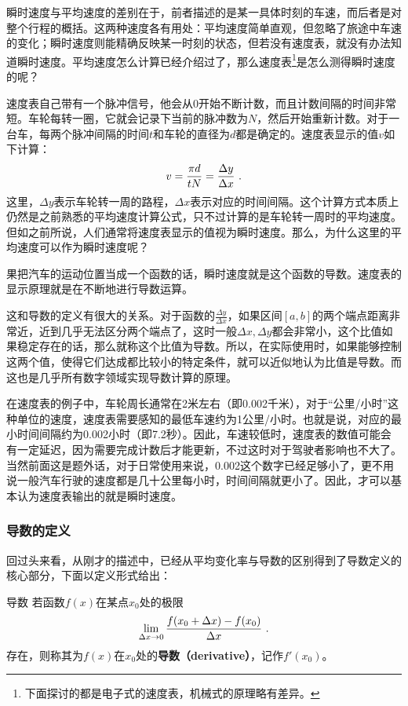 瞬时速度与平均速度的差别在于，前者描述的是某一具体时刻的车速，而后者是对整个行程的概括。这两种速度各有用处：平均速度简单直观，但忽略了旅途中车速的变化；瞬时速度则能精确反映某一时刻的状态，但若没有速度表，就没有办法知道瞬时速度。平均速度怎么计算已经介绍过了，那么速度表\footnote{下面探讨的都是电子式的速度表，机械式的原理略有差异。}是怎么测得瞬时速度的呢？

速度表自己带有一个脉冲信号，他会从0开始不断计数，而且计数间隔的时间非常短。车轮每转一圈，它就会记录下当前的脉冲数为$N$，然后开始重新计数。对于一台车，每两个脉冲间隔的时间$t$和车轮的直径为$d$都是确定的。速度表显示的值$v$如下计算：
\begin{equation}
v={\pi d\over tN}=\frac{\Delta y}{\Delta x}~.
\end{equation}
这里，$\Delta y$表示车轮转一周的路程，$\Delta x$表示对应的时间间隔。这个计算方式本质上仍然是之前熟悉的平均速度计算公式，只不过计算的是车轮转一周时的平均速度。但如之前所说，人们通常将速度表显示的值视为瞬时速度。那么，为什么这里的平均速度可以作为瞬时速度呢？

果把汽车的运动位置当成一个函数的话，瞬时速度就是这个函数的导数。速度表的显示原理就是在不断地进行导数运算。

这和导数的定义有很大的关系。对于函数的$\displaystyle\frac{\Delta y}{\Delta x}$，如果区间$[a, b]$的两个端点距离非常近，近到几乎无法区分两个端点了，这时一般$\Delta x,\Delta y$都会非常小，这个比值如果稳定存在的话，那么就称这个比值为导数。所以，在实际使用时，如果能够控制这两个值，使得它们达成都比较小的特定条件，就可以近似地认为比值是导数。而这也是几乎所有数字领域实现导数计算的原理。

在速度表的例子中，车轮周长通常在2米左右（即0.002千米），对于“公里/小时”这种单位的速度，速度表需要感知的最低车速约为1公里/小时。也就是说，对应的最小时间间隔约为0.002小时（即7.2秒）。因此，车速较低时，速度表的数值可能会有一定延迟，因为需要完成计数后才能更新，不过这时对于驾驶者影响也不大了。当然前面这是题外话，对于日常使用来说，0.002这个数字已经足够小了，更不用说一般汽车行驶的速度都是几十公里每小时，时间间隔就更小了。因此，才可以基本认为速度表输出的就是瞬时速度。

\subsubsection{导数的定义}

回过头来看，从刚才的描述中，已经从平均变化率与导数的区别得到了导数定义的核心部分，下面以定义形式给出：

\begin{definition}{导数}
若函数$f(x)$在某点$x_0$处的极限
\begin{equation}
\lim_{\Delta x\to 0}{f(x_0+\Delta x)-f(x_0)\over \Delta x}~.
\end{equation}
存在，则称其为$f(x)$在$x_0$处的\textbf{导数（derivative）}，记作$f'(x_0)$。
\end{definition}

